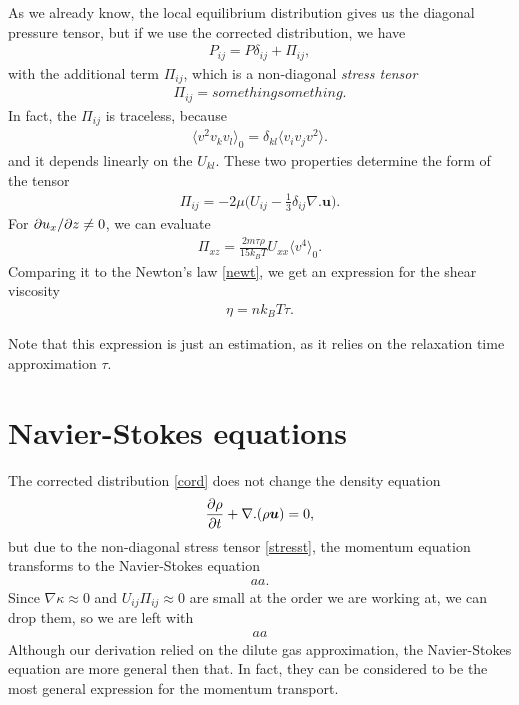 As we already know, the local equilibrium distribution gives us the diagonal pressure tensor, but if we use the corrected distribution, we have
\begin{align}
P_{ij} = P \delta_{ij} + \Pi_{ij},
\end{align}
with the additional term $\Pi_{ij}$, which is a non-diagonal \textit{stress tensor}
\begin{align*}
\Pi_{ij} = something something.
\end{align*}
In fact, the $\Pi_{ij}$ is traceless, because
\begin{align*}
\langle v^2 v_k v_l \rangle_0 = \delta_{kl} \langle v_i v_j v^2 \rangle. 
\end{align*}
and it depends linearly on the $U_{kl}$.
These two properties determine the form of the tensor
\begin{align} \label{stresst}
\Pi_{ij} = -2 \mu \big( U_{ij} - \frac{1}{3} \delta_{ij} \nabla . \bm{u} \big).
\end{align}
For $\partial u_x / \partial z \neq 0$, we can evaluate
\begin{align*}
\Pi_{xz} = \frac{2m\tau \rho}{15k_B T} U_{xx} \langle v^4 \rangle_0.
\end{align*}
Comparing it to the Newton's law \ref{newt}, we get an expression for the shear viscosity
\begin{align} \label{shearv}
\eta = n k_B T \tau.
\end{align}

Note that this expression is just an estimation, as it relies on the relaxation time approximation $\tau$.

\section{Navier-Stokes equations}

The corrected distribution \ref{cord} does not change the density equation
\begin{align*}
\frac{\partial \rho}{\partial t} + \nabla . (\rho \bm{u}) = 0,
\end{align*}
but due to the non-diagonal stress tensor \ref{stresst}, the momentum equation transforms to the Navier-Stokes equation
\begin{align}
aa.
\end{align}
Since $\nabla \kappa \approx 0$ and $U_{ij} \Pi_{ij} \approx 0$ are small at the order we are working at, we can drop them, so we are left with
\begin{align*}
aa
\end{align*}
Although our derivation relied on the dilute gas approximation, the Navier-Stokes equation are more general then that. In fact, they can be considered to be the most general expression for the momentum transport.

